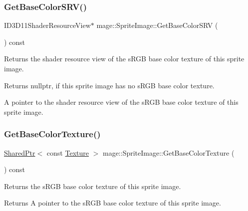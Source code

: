 \subsubsection{\texorpdfstring{Get\+Base\+Color\+S\+R\+V()}{GetBaseColorSRV()}}
{\footnotesize\ttfamily I\+D3\+D11\+Shader\+Resource\+View$\ast$ mage\+::\+Sprite\+Image\+::\+Get\+Base\+Color\+S\+RV (\begin{DoxyParamCaption}{ }\end{DoxyParamCaption}) const\hspace{0.3cm}{\ttfamily [noexcept]}}

Returns the shader resource view of the s\+R\+GB base color texture of this sprite image.

\begin{DoxyReturn}{Returns}
{\ttfamily nullptr}, if this sprite image has no s\+R\+GB base color texture. 

A pointer to the shader resource view of the s\+R\+GB base color texture of this sprite image. 
\end{DoxyReturn}
\hypertarget{classmage_1_1_sprite_image_a7fa3f86018f033288c755a665ee90bc2}{}\label{classmage_1_1_sprite_image_a7fa3f86018f033288c755a665ee90bc2} 
\subsubsection{\texorpdfstring{Get\+Base\+Color\+Texture()}{GetBaseColorTexture()}}
{\footnotesize\ttfamily \hyperlink{namespacemage_a1e01ae66713838a7a67d30e44c67703e}{Shared\+Ptr}$<$ const \hyperlink{classmage_1_1_texture}{Texture} $>$ mage\+::\+Sprite\+Image\+::\+Get\+Base\+Color\+Texture (\begin{DoxyParamCaption}{ }\end{DoxyParamCaption}) const\hspace{0.3cm}{\ttfamily [noexcept]}}

Returns the s\+R\+GB base color texture of this sprite image.

\begin{DoxyReturn}{Returns}
A pointer to the s\+R\+GB base color texture of this sprite image. 
\end{DoxyReturn}
\hypertarget{classmage_1_1_sprite_image_a74713ac25073002cd7425482bb474366}{}\label{classmage_1_1_sprite_image_a74713ac25073002cd7425482bb474366} 
